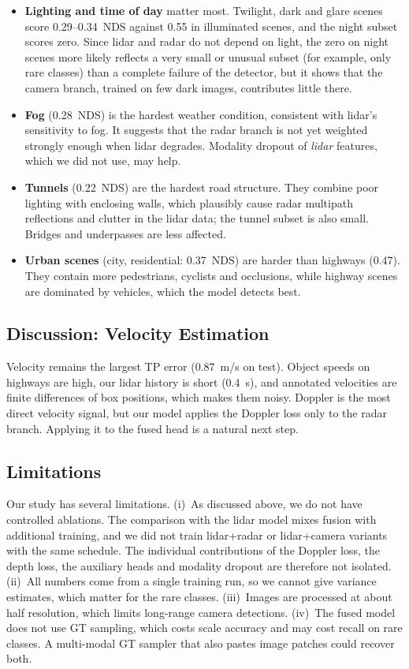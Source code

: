 \documentclass[conference]{IEEEtran}
\begin{document}
\begin{itemize}
\item \textbf{Lighting and time of day} matter most. Twilight, dark and glare scenes score 0.29--0.34~NDS against
0.55 in illuminated scenes, and the night subset scores zero. Since lidar and radar do not depend on light, the zero
on night scenes more likely reflects a very small or unusual subset (for example, only rare classes) than a complete
failure of the detector, but it shows that the camera branch, trained on few dark images, contributes little there.
\item \textbf{Fog} (0.28~NDS) is the hardest weather condition, consistent with lidar's sensitivity to fog. It
suggests that the radar branch is not yet weighted strongly enough when lidar degrades. Modality dropout of
\emph{lidar} features, which we did not use, may help.
\item \textbf{Tunnels} (0.22~NDS) are the hardest road structure. They combine poor lighting with enclosing walls,
which plausibly cause radar multipath reflections and clutter in the lidar data; the tunnel subset is also small.
Bridges and underpasses are less affected.
\item \textbf{Urban scenes} (city, residential: 0.37~NDS) are harder than highways (0.47). They contain more
pedestrians, cyclists and occlusions, while highway scenes are dominated by vehicles, which the model detects best.
\end{itemize}

\subsection{Discussion: Velocity Estimation}

Velocity remains the largest TP error (0.87~m/s on test). Object speeds on highways are high, our lidar history is
short (0.4~s), and annotated velocities are finite differences of box positions, which makes them noisy. Doppler is
the most direct velocity signal, but our model applies the Doppler loss only to the radar branch. Applying it to the
fused head is a natural next step.

\subsection{Limitations}
\label{sec:limits}

Our study has several limitations. (i)~As discussed above, we do not have controlled ablations. The comparison with
the lidar model mixes fusion with additional training, and we did not train lidar+radar or lidar+camera variants
with the same schedule. The individual contributions of the Doppler loss, the depth loss, the auxiliary heads and
modality dropout are therefore not isolated. (ii)~All numbers come from a single training run, so we cannot give
variance estimates, which matter for the rare classes. (iii)~Images are processed at about half resolution, which
limits long-range camera detections. (iv)~The fused model does not use GT sampling, which costs scale accuracy and
may cost recall on rare classes. A multi-modal GT sampler that also pastes image patches could recover both.
\end{document}
